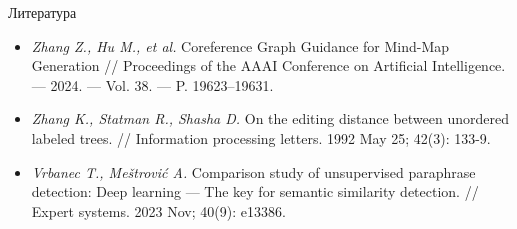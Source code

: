 \documentclass{beamer}
\begin{document}
\begin{frame}{Литература}

\begin{itemize}
    \item \textit{Zhang Z., Hu M., et al.} Coreference Graph Guidance for Mind-Map Generation // Proceedings of the AAAI Conference on Artificial Intelligence. — 2024. — Vol. 38. — P. 19623–19631.
    \item \textit{Zhang K., Statman R., Shasha D.} On the editing distance between unordered labeled trees. // Information processing letters. 1992 May 25; 42(3): 133-9.
    \item \textit{Vrbanec T., Meštrović A.} Comparison study of unsupervised paraphrase detection: Deep learning — The key for semantic similarity detection. // Expert systems. 2023 Nov; 40(9): e13386.
\end{itemize}

\end{frame}

\end{document}
